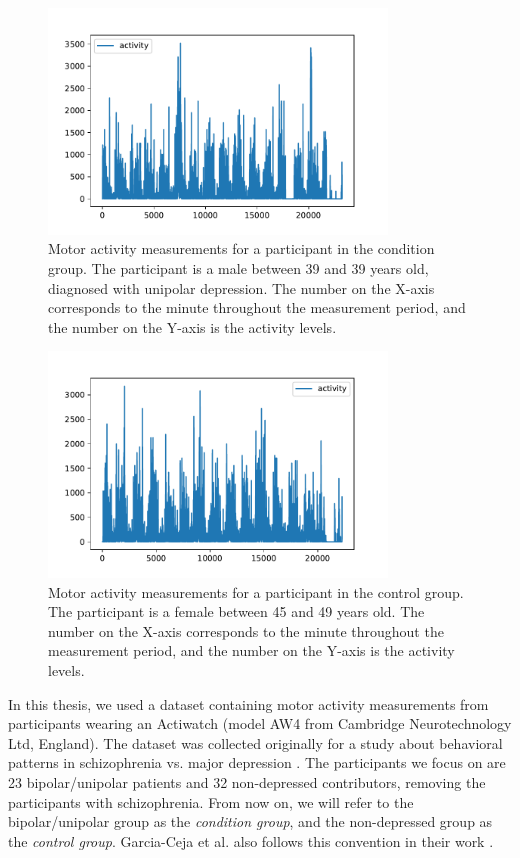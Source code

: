 \begin{figure}[h]
  \begin{center}
      \includegraphics[height=6cm]{img/activity_condition_1.pdf}
      \caption{Motor activity measurements for a participant in the condition group. The participant is a male between 39 and 39 years old, diagnosed with unipolar depression. The number on the X-axis corresponds to the minute throughout the measurement period, and the number on the Y-axis is the activity levels.}
      \label{figure:participant_activity}
  \end{center}
\end{figure}
\begin{figure}[h]
  \begin{center}
    \includegraphics[height=6cm]{img/activity_control_1.pdf}
    \caption{Motor activity measurements for a participant in the control group. The participant is a female between 45 and 49 years old. The number on the X-axis corresponds to the minute throughout the measurement period, and the number on the Y-axis is the activity levels.}
    \label{figure:participant_activity_control}
  \end{center}
\end{figure}

In this thesis, we used a dataset containing motor activity measurements from participants wearing an Actiwatch (model AW4 from Cambridge Neurotechnology Ltd, England). The dataset was collected originally for a study about behavioral patterns in schizophrenia vs. major depression \cite{Berle2010}. The participants we focus on are 23 bipolar/unipolar patients and 32 non-depressed contributors, removing the participants with schizophrenia. From now on, we will refer to the bipolar/unipolar group as the \textit{condition group}, and the non-depressed group as the \textit{control group}. Garcia-Ceja et al. also follows this convention in their work \cite{GarciaCeja2018_classification_bipolar}.

